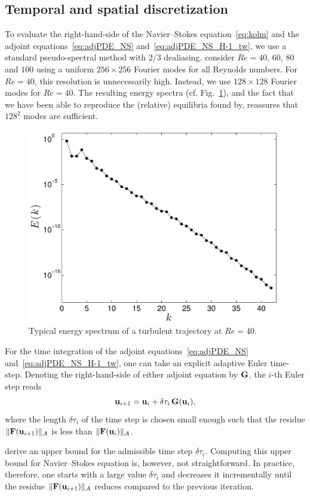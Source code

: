 \documentclass{article}
\begin{document}
\subsection{Temporal and spatial discretization}
To evaluate the right-hand-side of the Navier--Stokes equation~\eqref{eq:kolm} and the adjoint
equations~\eqref{eq:adjPDE_NS} and~\eqref{eq:adjPDE_NS_H-1_tw}, we use a standard pseudo-spectral
method with $2/3$ dealiasing. \cite{CK13} consider $Re=40$, $60$, $80$ and $100$ using a uniform
$256\times 256$ Fourier modes for all Reynolds numbers. For $Re=40$, this resolution is
unnecessarily high. Instead, we use $128\times 128$ Fourier modes for $Re=40$.
The resulting energy spectra (cf. Fig.~\ref{fig:Ek}), and the fact that we have been
able to reproduce the (relative) equilibria found by, reassures that $128^2$ modes are
sufficient.
%
\begin{figure}
\centering
\includegraphics[width=.65\textwidth]{Espec}
\caption{Typical energy spectrum of a turbulent trajectory at $Re=40$.}
\label{fig:Ek}
\end{figure}

For the time integration of the adjoint equations~\eqref{eq:adjPDE_NS}
and~\eqref{eq:adjPDE_NS_H-1_tw},
one can take an explicit adaptive Euler time-step. Denoting the right-hand-side of either adjoint
equation by $\mathbf G$, the $i$-th Euler step reads
$$\mathbf u_{i+1}=\mathbf u_i+\delta\tau_i\,\mathbf G(\mathbf u_i),$$
where the length $\delta\tau_i$ of the time step is chosen small enough such that the residue
$\|\mathbf F(\mathbf u_{i+1})\|_{\mathcal A}$ is less than $\|\mathbf F(\mathbf u_{i})\|_{\mathcal A}$.

\cite{yang07} derive an upper bound for the admissible time step $\delta\tau_i$.
Computing this upper bound for Navier--Stokes equation is, however, not straightforward.
In practice, therefore, one starts with a large value $\delta\tau_i$ and decreases it incrementally
until the residue $\|\mathbf F(\mathbf u_{i+1})\|_{\mathcal A}$ reduces compared to the previous iteration.
\end{document}
